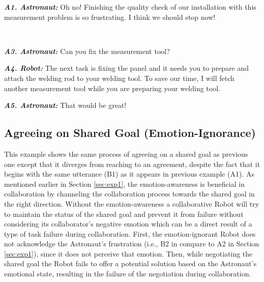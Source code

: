 \begin{spacing}{1.3}
\small{ 
\begin{description}
  \item \textit{\textbf{A1. Astronaut:}} Oh no! Finishing the quality check of
  our installation with this measurement problem is so frustrating. I think we
  should stop now!\\

  \item {}\\
  
  \item \textit{\textbf{A3. Astronaut:}} Can you fix the measurement tool?\\

  \item \textit{\textbf{A4. Robot:}} The next task is fixing the panel and it
  needs you to prepare and attach the welding rod to your welding tool. To save
  our time, I will fetch another measurement tool while you are preparing your
  welding tool.\\

  \item \textit{\textbf{A5. Astronaut:}} That would be great!
  
\end{description}
}
\end{spacing}

\subsection{Agreeing on Shared Goal (Emotion-Ignorance)}
\label{sec:exp2}

This example shows the same process of agreeing on a shared goal as previous
one except that it diverges from reaching to an agreement, despite the fact
that it begins with the same utterance (B1) as it appears in previous example
(A1). As mentioned earlier in Section \ref{sec:exp1}, the emotion-awareness is
beneficial in collaboration by channeling the collaboration process towards the
shared goal in the right direction. Without the emotion-awareness a
collaborative Robot will try to maintain the status of the shared goal and
prevent it from failure without considering its collaborator's negative emotion
which can be a direct result of a type of task failure during collaboration.
First, the emotion-ignorant Robot does not acknowledge the Astronaut's
frustration (i.e., B2 in compare to A2 in Section \ref{sec:exp1}), since it does
not perceive that emotion. Then, while negotiating the shared goal the Robot
fails to offer a potential solution based on the Astronaut's emotional state,
resulting in the failure of the negotiation during collaboration.

